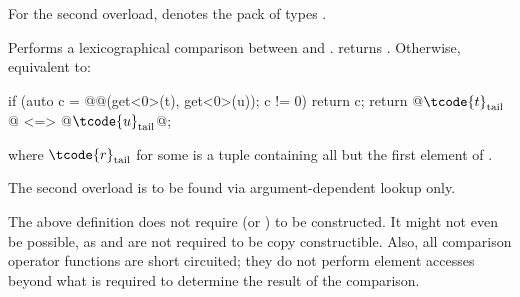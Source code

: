 \documentclass{wg21}
\begin{document}
\begin{itemdescr}

    \begin{addedblock}
        For the second overload,  denotes the pack of types .
    \end{addedblock}

    \pnum
    \effects
    Performs a lexicographical comparison between  and .
     returns .
    Otherwise, equivalent to:
    \begin{codeblock}
        if (auto c = @@(get<0>(t), get<0>(u)); c != 0) return c;
        return @$\tcode{t}_\mathrm{tail}$@ <=> @$\tcode{u}_\mathrm{tail}$@;
    \end{codeblock}
    where $\tcode{r}_\mathrm{tail}$ for some  
    is a tuple containing all but the first element of .

    \begin{addedblock}
        \remarks The second overload is to be found via argument-dependent lookup only.
    \end{addedblock}
\end{itemdescr}


\pnum
\begin{note}
    The above definition does not require 
    (or ) to be constructed. It might not
    even be possible, as  and  are not required to be copy
    constructible. Also, all comparison operator functions are short circuited;
    they do not perform element accesses beyond what is required to determine the
    result of the comparison.
\end{note}
\end{document}

